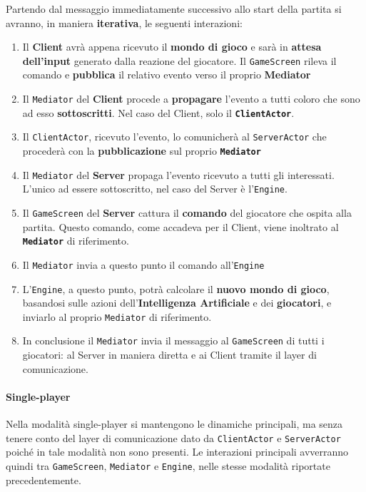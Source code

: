 Partendo dal messaggio immediatamente successivo allo start della partita si avranno, in maniera \textbf{iterativa}, le seguenti interazioni:
    \begin{enumerate}
        \item Il \textbf{Client} avrà appena ricevuto il \textbf{mondo di gioco} e sarà in \textbf{attesa dell'input} generato dalla reazione del giocatore. 
        Il \texttt{GameScreen} rileva il comando e \textbf{pubblica} il relativo evento verso il proprio \textbf{Mediator}
        \item Il \texttt{Mediator} del \textbf{Client} procede a \textbf{propagare} l'evento a tutti coloro che sono ad esso \textbf{sottoscritti}. Nel caso del Client, solo il \textbf{\texttt{ClientActor}}.
        \item Il \texttt{ClientActor}, ricevuto l'evento, lo comunicherà al \texttt{ServerActor} che procederà con la \textbf{pubblicazione} sul proprio \texttt{\textbf{Mediator}}
        \item Il \texttt{Mediator} del \textbf{Server} propaga l'evento ricevuto a tutti gli interessati. L'unico ad essere sottoscritto, nel caso del Server è l'\texttt{Engine}.
        \item Il \texttt{GameScreen} del \textbf{Server} cattura il \textbf{comando} del giocatore che ospita alla partita. Questo comando, come accadeva per il Client, viene inoltrato al \texttt{\textbf{Mediator}} di riferimento.
        \item Il \texttt{Mediator} invia a questo punto il comando all'\texttt{Engine} 
        \item L'\texttt{Engine}, a questo punto, potrà calcolare il \textbf{nuovo mondo di gioco}, basandosi sulle azioni dell'\textbf{Intelligenza Artificiale} e dei \textbf{giocatori}, e inviarlo al proprio \texttt{Mediator} di riferimento.
        \item In conclusione il \texttt{Mediator} invia il messaggio al \texttt{GameScreen} di tutti i giocatori: al Server in maniera diretta e ai Client tramite il layer di comunicazione.
    \end{enumerate}
\paragraph{Single-player} Nella modalità single-player si mantengono le dinamiche principali, ma senza tenere conto del layer di comunicazione dato da \texttt{ClientActor} e \texttt{ServerActor} poiché in tale modalità non sono presenti. Le interazioni principali avverranno quindi tra \texttt{GameScreen}, \texttt{Mediator} e \texttt{Engine}, nelle stesse modalità riportate precedentemente.

